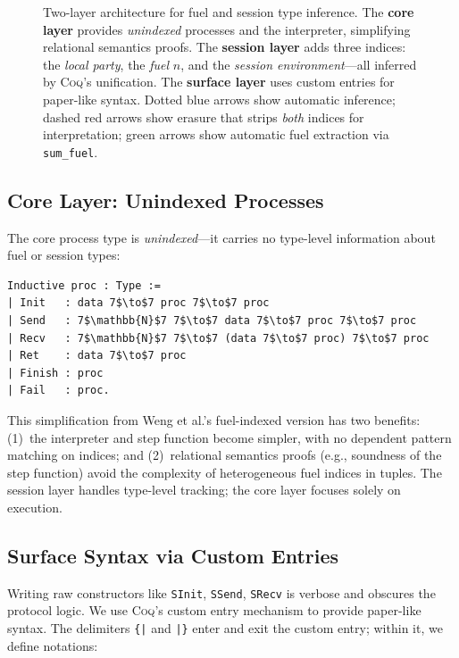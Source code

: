 \documentclass[11pt]{article}
\newcommand{\coqin}[1]{\texttt{#1}}
\newcommand{\coq}{\textsc{Coq}}
\begin{document}
\begin{figure}[htbp]
\begin{tikzpicture}
  \end{tikzpicture}
  \caption{Two-layer architecture for fuel and session type inference.
    The \textbf{core layer} provides \emph{unindexed} processes and the interpreter,
    simplifying relational semantics proofs.
    The \textbf{session layer} adds three indices: the \emph{local party},
    the \emph{fuel} $n$, and the \emph{session environment}---all inferred by
    \coq{}'s unification.
    The \textbf{surface layer} uses custom entries for paper-like syntax.
    Dotted blue arrows show automatic inference; dashed red arrows show erasure
    that strips \emph{both} indices for interpretation; green arrows show
    automatic fuel extraction via \coqin{sum\_fuel}.}
  \label{fig:fuel-session-architecture}
\end{figure}

\subsection{Core Layer: Unindexed Processes}

The core process type is \emph{unindexed}---it carries no type-level
information about fuel or session types:

\begin{verbatim}
Inductive proc : Type :=
| Init   : data 7$\to$7 proc 7$\to$7 proc
| Send   : 7$\mathbb{N}$7 7$\to$7 data 7$\to$7 proc 7$\to$7 proc
| Recv   : 7$\mathbb{N}$7 7$\to$7 (data 7$\to$7 proc) 7$\to$7 proc
| Ret    : data 7$\to$7 proc
| Finish : proc
| Fail   : proc.
\end{verbatim}

This simplification from Weng et al.'s fuel-indexed version has two benefits:
(1)~the interpreter and step function become simpler, with no dependent
pattern matching on indices; and (2)~relational semantics proofs (e.g.,
soundness of the step function) avoid the complexity of heterogeneous
fuel indices in tuples. The session layer handles type-level tracking;
the core layer focuses solely on execution.

\subsection{Surface Syntax via Custom Entries}

Writing raw constructors like \coqin{SInit}, \coqin{SSend}, \coqin{SRecv}
is verbose and obscures the protocol logic. We use \coq{}'s custom entry
mechanism to provide paper-like syntax. The delimiters \coqin{\{|} and
\coqin{|\}} enter and exit the custom entry; within it, we define notations:
\end{document}
